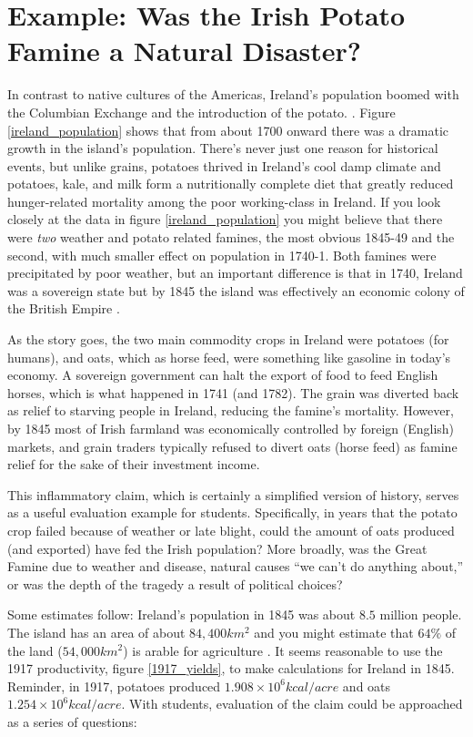 \documentclass[12pt]{iopart}
\begin{document}
\clearpage


\section{Example: Was the Irish Potato Famine a Natural Disaster?}
In contrast to native cultures of the Americas, Ireland's population boomed with the Columbian Exchange and the introduction of the potato. \cite{potato,little_ice_age}.  Figure \ref{ireland_population} shows that from about 1700 onward there was a dramatic growth in the island's population.  There's never just one reason for historical events, but unlike grains, potatoes thrived in Ireland's cool damp climate and potatoes, kale, and milk form a nutritionally complete diet that greatly reduced hunger-related mortality among the poor working-class in Ireland.  If you look closely at the data in figure \ref{ireland_population} you might believe that there were \textit{two} weather and potato related famines, the most obvious 1845-49 and the second, with much smaller effect on population in 1740-1.  Both famines were precipitated by poor weather, but an important difference is that in 1740, Ireland was a sovereign state but by 1845 the island was effectively an economic colony of the British Empire \cite{little_ice_age}.  

As the story goes, the two main commodity crops in Ireland were potatoes (for humans), and oats, which as horse feed, were something like gasoline in today's economy.  A sovereign government can halt the export of food to feed English horses, which is what happened in 1741 (and 1782). The grain was diverted back as relief to starving people in Ireland, reducing the famine's mortality. However, by 1845 most of Irish farmland was economically controlled by foreign (English) markets, and grain traders typically refused to divert oats (horse feed) as famine relief for the sake of their investment income.

This inflammatory claim, which is certainly a simplified version of history, serves as a useful evaluation example for students. Specifically, in years that the potato crop failed because of weather or late blight, could the amount of oats produced (and exported) have fed the Irish population?  More broadly, was the Great Famine due to weather and disease, natural causes ``we can't do anything about,''  or was the depth of the tragedy a result of political choices?

Some estimates follow:  Ireland's population in 1845 was about $8.5$ million people.  The island has an area of about $84,400km^2$ \cite{IRE_area} and you might estimate that $64\%$ of the land ($54,000km^2$) is arable for agriculture \cite{arable_percentage}.  
It seems reasonable to use the 1917 productivity,  figure \ref{1917_yields},  to make calculations for Ireland in 1845.  Reminder, in 1917, potatoes produced $1.908\times10^6 kcal/acre$ and oats $1.254\times10^6kcal/acre$.
With students, evaluation of the claim could be approached as a series of questions:
\end{document}

